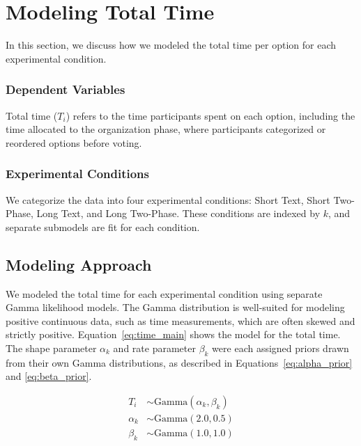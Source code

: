 \section{Modeling Total Time} \label{sec:apdx:model_time}

In this section, we discuss how we modeled the total time per option for each experimental condition.

\subsubsection{Dependent Variables} Total time ($T_i$) refers to the time participants spent on each option, including the time allocated to the organization phase, where participants categorized or reordered options before voting.

\subsubsection{Experimental Conditions} We categorize the data into four experimental conditions: Short Text, Short Two-Phase, Long Text, and Long Two-Phase. These conditions are indexed by $k$, and separate submodels are fit for each condition.

\subsection{Modeling Approach} We modeled the total time for each experimental condition using separate Gamma likelihood models. The Gamma distribution is well-suited for modeling positive continuous data, such as time measurements, which are often skewed and strictly positive. Equation~\ref{eq:time_main} shows the model for the total time. The shape parameter $\alpha_k$ and rate parameter $\beta_k$ were each assigned priors drawn from their own Gamma distributions, as described in Equations~\ref{eq:alpha_prior} and \ref{eq:beta_prior}.

\begin{align}
    T_i &\sim \text{Gamma}(\alpha_k, \beta_k) \label{eq:time_main} \\
    \alpha_k &\sim \text{Gamma}(2.0, 0.5) \label{eq:alpha_prior} \\
    \beta_k &\sim \text{Gamma}(1.0, 1.0) \label{eq:beta_prior}
\end{align}